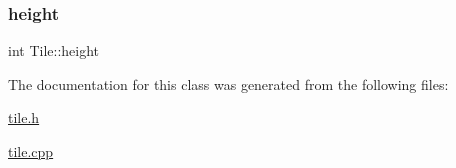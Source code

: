 \mbox{\label{classTile_a1ceee2a6a986af91980d62c039ffe792}} 
\subsubsection{\texorpdfstring{height}{height}}
{\footnotesize\ttfamily int Tile\+::height\hspace{0.3cm}{\ttfamily [private]}}



The documentation for this class was generated from the following files\+:\begin{DoxyCompactItemize}
\item 
\hyperlink{tile_8h}{tile.\+h}\item 
\hyperlink{tile_8cpp}{tile.\+cpp}\end{DoxyCompactItemize}
